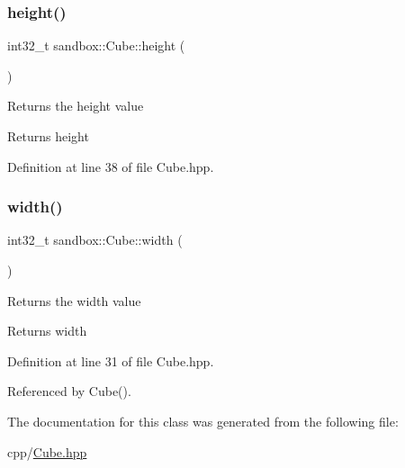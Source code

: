 \mbox{\label{classsandbox_1_1_cube_a4b82fdc43ad08573526420833a90a4d4}} 
\subsubsection{\texorpdfstring{height()}{height()}}
{\footnotesize\ttfamily int32\+\_\+t sandbox\+::\+Cube\+::height (\begin{DoxyParamCaption}{ }\end{DoxyParamCaption})\hspace{0.3cm}{\ttfamily [inline]}}

Returns the height value \begin{DoxyReturn}{Returns}
height 
\end{DoxyReturn}


Definition at line 38 of file Cube.\+hpp.

\mbox{\label{classsandbox_1_1_cube_aa485ef5e5e082183f1d9b8565365dfb5}} 
\subsubsection{\texorpdfstring{width()}{width()}}
{\footnotesize\ttfamily int32\+\_\+t sandbox\+::\+Cube\+::width (\begin{DoxyParamCaption}{ }\end{DoxyParamCaption})\hspace{0.3cm}{\ttfamily [inline]}}

Returns the width value \begin{DoxyReturn}{Returns}
width 
\end{DoxyReturn}


Definition at line 31 of file Cube.\+hpp.



Referenced by Cube().



The documentation for this class was generated from the following file\+:\begin{DoxyCompactItemize}
\item 
cpp/\mbox{\hyperlink{_cube_8hpp}{Cube.\+hpp}}\end{DoxyCompactItemize}
